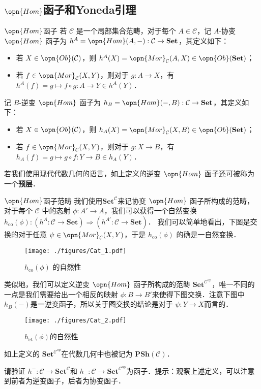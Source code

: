 \subsection{$\opn{Hom}$函子和Yoneda引理}
\begin{definition}{$\opn{Hom}$函子}
若 $\mathcal{C}$ 是一个局部集合范畴，对于每个 $A\in\mathcal{C}$，记 $A$-协变 $\opn{Hom}$ 函子为 $h^A=\opn{Hom}(A,-):\mathcal{C}\to\mathbf{Set}$，其定义如下：
\begin{itemize}
\item 若 $X\in\opn{Ob}(\mathcal{C})$，则 $h^A(X)=\opn{Mor}_\mathcal{C}(A,X)\in\opn{Ob}(\mathbf{Set})$；
\item 若 $f\in\opn{Mor}_\mathcal{C}(X,Y)$，则对于 $g:A\to X$，有 $h^A(f)=g\mapsto f\circ g:A\to Y\in h^A(Y)$．
\end{itemize}

记 $B$-逆变 $\opn{Hom}$ 函子为 $h_B=\opn{Hom}(-,B):\mathcal{C}\to\mathbf{Set}$，其定义如下：
\begin{itemize}
\item 若 $X\in\opn{Ob}(\mathcal{C})$，则 $h_A(X)=\opn{Mor}_\mathcal{C}(X,B)\in\opn{Ob}(\mathbf{Set})$；
\item 若 $f\in\opn{Mor}_\mathcal{C}(X,Y)$，则对于 $g:X\to B$，有 $h_A(f)=g\mapsto g\circ f:Y\to B\in h_A(Y)$．
\end{itemize}
\end{definition}
若我们使用现代代数几何的语言，如上定义的逆变 $\opn{Hom}$ 函子还可被称为一个\textbf{预层}．
\begin{definition}{$\opn{Hom}$函子范畴}
我们使用$\mathbf{Set}^\mathcal{C}$来记协变 $\opn{Hom}$ 函子所构成的范畴，对于每个 $\mathcal{C}$ 中的态射 $\phi:A'\to A$，我们可以获得一个自然变换 $h_{\text{co}}(\phi):(h^A:\mathcal{C}\to\mathbf{Set})\Rightarrow(h^{A'}:\mathcal{C}\to\mathbf{Set})$．
我们可以简单地看出，下图是交换的对于任意 $\psi\in\opn{Mor}_\mathcal{C}(X,Y)$，于是 $h_\text{co}(\phi)$ 的确是一自然变换．
\begin{figure}[h!]
\centering
\texttt{[image: ./figures/Cat\_1.pdf]}
\caption{$h_{\text{co}}(\phi)$ 的自然性} \label{Cat_fig1}
\end{figure}
类似地，我们可以定义逆变 $\opn{Hom}$ 函子所构成的范畴 $\mathbf{Set}^{\mathcal{C}^\text{op}}$，唯一不同的一点是我们需要给出一个相反的映射 $\phi:B\to B'$来使得下图交换．注意下图中 $h_B(-)$是一逆变函子，所以关于图交换的结论是对于 $\psi:Y\to X$而言的．
\begin{figure}[ht]
\centering
\texttt{[image: ./figures/Cat\_2.pdf]}
\caption{$h_{\text{ct}}(\phi)$的自然性} \label{Cat_fig2}
\end{figure}
\end{definition}
如上定义的 $\mathbf{Set}^{\mathcal{C}^\text{op}}$在代数几何中也被记为 $\mathbf{PSh}(\mathcal{C})$．
\begin{exercise}{}
请验证 $h^{-}:\mathcal{C}\to\mathbf{Set}^\mathcal{C}$和 $h_{-}:\mathcal{C}\to\mathbf{Set}^{\mathcal{C}^\text{op}}$为函子．提示：观察上述定义，可以注意到前者为逆变函子，后者为协变函子．
\end{exercise}

